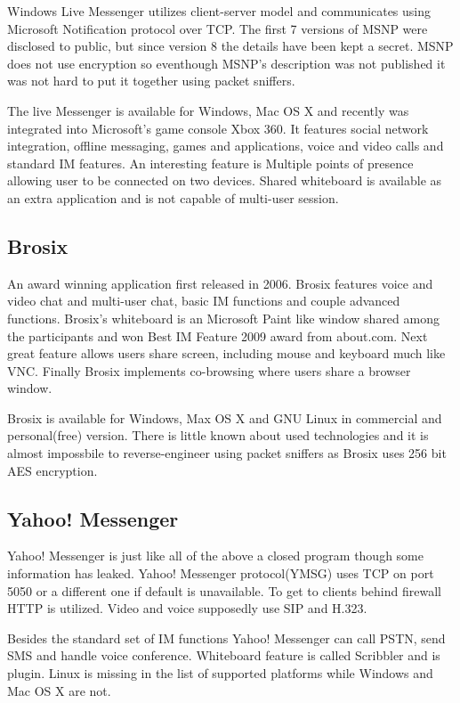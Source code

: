 Windows Live Messenger utilizes client-server model and communicates using Microsoft Notification protocol over TCP. The first 7 versions of MSNP were disclosed to public, but since version 8 the details have been kept a secret. MSNP does not use encryption so eventhough MSNP's description was not published it was not hard to put it together using packet sniffers.

The live Messenger is available for Windows, Mac OS X and recently was integrated into Microsoft's game console Xbox 360. It features social network integration, offline messaging, games and applications, voice and video calls and standard IM features. An interesting feature is Multiple points of presence allowing user to be connected on two devices. Shared whiteboard is available as an extra application and is not capable of multi-user session.   

\subsection*{Brosix}
An award winning application first released in 2006. Brosix features voice and video chat and multi-user chat, basic IM functions and couple advanced functions. Brosix's whiteboard is an Microsoft Paint like window shared among the participants and won Best IM Feature 2009 award from about.com. Next great feature allows users share screen, including mouse and keyboard much like VNC. Finally Brosix implements co-browsing where users share a browser window. 

Brosix is available for Windows, Max OS X and GNU Linux in commercial and personal(free) version. There is little known about used technologies and it is almost impossbile to reverse-engineer using packet sniffers as Brosix uses 256 bit AES encryption.

\subsection*{Yahoo! Messenger}
Yahoo! Messenger is just like all of the above a closed program though some information has leaked\cite{wikipediaYahoo}. Yahoo! Messenger protocol(YMSG) uses TCP on port 5050 or a different one if default is unavailable. To get to clients behind firewall HTTP is utilized. Video and voice supposedly use SIP and H.323.

Besides the standard set of IM functions Yahoo! Messenger can call PSTN, send SMS and handle voice conference. Whiteboard feature is called Scribbler and is plugin. Linux is missing in the list of supported platforms while Windows and Mac OS X are not.

